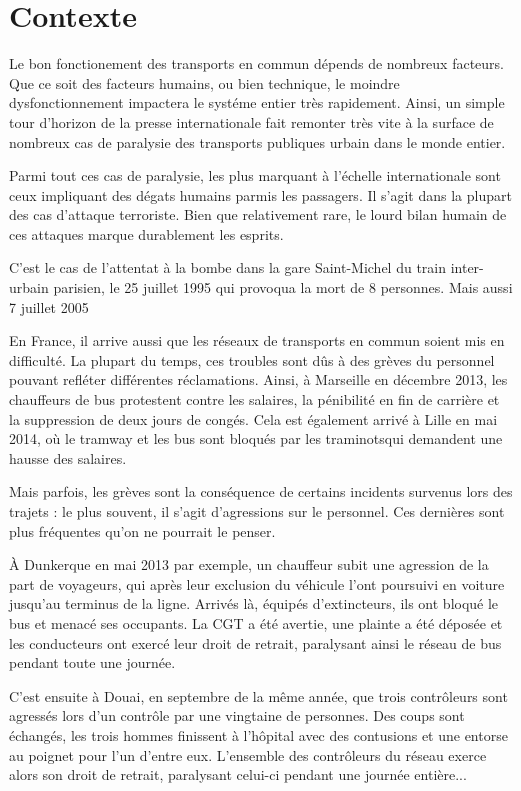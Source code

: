 \chapter{Contexte}
	Le bon fonctionement des transports en commun dépends de nombreux facteurs. Que ce soit des facteurs humains, ou bien technique, le moindre dysfonctionnement impactera le systéme entier très rapidement. Ainsi, un simple tour d'horizon de la presse internationale fait remonter très vite à la surface de nombreux cas de paralysie des transports publiques urbain dans le monde entier.

	Parmi tout ces cas de paralysie, les plus marquant à l'échelle internationale sont ceux impliquant des dégats humains parmis les passagers. Il s'agit dans la plupart des cas d'attaque terroriste. Bien que relativement rare, le lourd bilan humain de ces attaques marque durablement les esprits.

	C'est le cas de l'attentat à la bombe dans la gare Saint-Michel du train inter-urbain parisien, le 25 juillet 1995 qui provoqua la mort de 8 personnes. Mais aussi 7 juillet 2005

	En France, il arrive aussi que les réseaux de transports en commun soient mis en difficulté. La plupart du temps, ces troubles sont dûs à des grèves du personnel pouvant refléter différentes réclamations. Ainsi, à Marseille en décembre 2013, les chauffeurs de bus protestent contre les salaires, la pénibilité en fin de carrière et la suppression de deux jours de congés. Cela est également arrivé à Lille en mai 2014, où le tramway et les bus sont bloqués par les traminotsqui demandent une hausse des salaires.

	Mais parfois, les grèves sont la conséquence de certains incidents survenus lors des trajets : le plus souvent, il s'agit d'agressions sur le personnel. Ces dernières sont plus fréquentes qu'on ne pourrait le penser.

	À Dunkerque en mai 2013 par exemple, un chauffeur subit une agression de la part de voyageurs, qui après leur exclusion du véhicule l'ont poursuivi en voiture jusqu'au terminus de la ligne. Arrivés là, équipés d'extincteurs, ils ont bloqué le bus et menacé ses occupants. La CGT a été avertie, une plainte a été déposée et les conducteurs ont exercé leur droit de retrait, paralysant ainsi le réseau de bus pendant toute une journée.

	C'est ensuite à Douai, en septembre de la même année, que trois contrôleurs sont agressés lors d'un contrôle par une vingtaine de personnes. Des coups sont échangés, les trois hommes finissent à l'hôpital avec des contusions et une entorse au poignet pour l'un d'entre eux. L'ensemble des contrôleurs du réseau exerce alors son droit de retrait, paralysant celui-ci pendant une journée entière...

